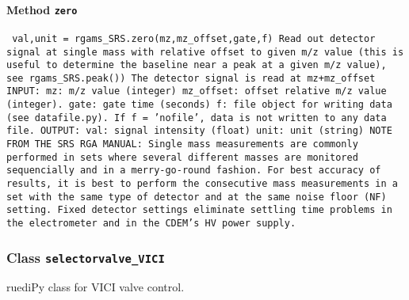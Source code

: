\paragraph{Method \texttt{zero}}
\vspace{1ex}
\texttt{\newline
val,unit = rgams_SRS.zero(mz,mz_offset,gate,f)\newline
\newline
Read out detector signal at single mass with relative offset to given m/z value (this is useful to determine the baseline near a peak at a given m/z value), see rgams_SRS.peak())\newline
The detector signal is read at mz+mz_offset\newline
\newline
INPUT:\newline
mz: m/z value (integer)\newline
mz_offset: offset relative m/z value (integer).\newline
gate: gate time (seconds)\newline
f: file object for writing data (see datafile.py). If f = 'nofile', data is not written to any data file.\newline
\newline
OUTPUT:\newline
val: signal intensity (float)\newline
unit: unit (string)\newline
\newline
NOTE FROM THE SRS RGA MANUAL:\newline
Single mass measurements are commonly performed in sets\newline
where several different masses are monitored sequencially\newline
and in a merry-go-round fashion.\newline
For best accuracy of results, it is best to perform the consecutive\newline
mass measurements in a set with the same type of detector\newline
and at the same noise floor (NF) setting.\newline
Fixed detector settings eliminate settling time problems\newline
in the electrometer and in the CDEM's HV power supply.\newline
\newline
}

\subsubsection{Class \texttt{selectorvalve_VICI}}
\par
ruediPy class for VICI valve control.\par

